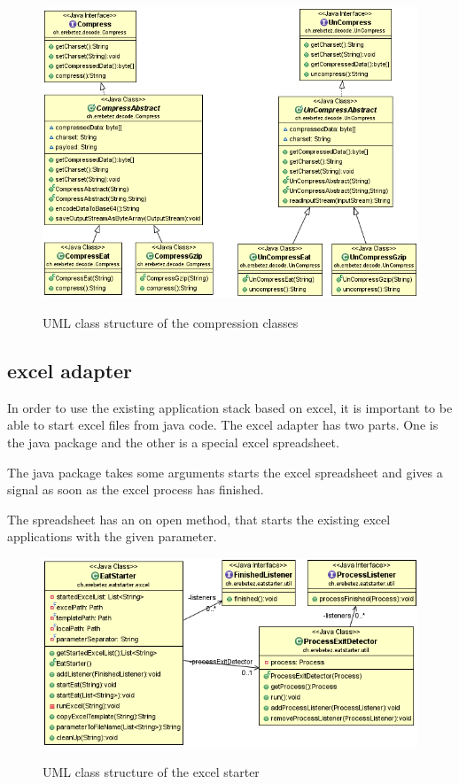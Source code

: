 \documentclass[paper=a4,twoside=false,BCOR=0mm,DIV=calc,fontsize=12pt]{scrartcl}
\begin{document}
\begin{figure}
    \begin{center}
      \includegraphics[width=1\textwidth]{./img/uml_decode_model.png}\\
    \end{center}
  \caption{UML class structure of the compression classes}
  \label{compressionClassUml}
\end{figure} 


\subsection{excel adapter}
In order to use the existing application stack based on excel, it is important to be able to start excel files from java code. 
The excel adapter has two parts. One is the java package and the other is a special excel spreadsheet. 

The java package takes some arguments starts the excel spreadsheet and gives a signal as soon as the excel process has finished.

The spreadsheet has an on open method, that starts the existing excel applications with the given parameter.

\begin{figure}
    \begin{center}
      \includegraphics[width=1\textwidth]{./img/uml_eatstatreter_model.png}\\
    \end{center}
  \caption{UML class structure of the excel starter}
  \label{eatstarterclassuml}
\end{figure} 
\end{document}
